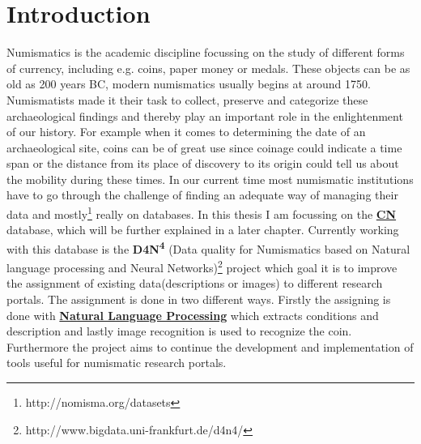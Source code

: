\documentclass[12pt, oneside]{article}
\begin{document}

\section{Introduction} \label{introduction}
Numismatics is the academic discipline focussing on the study of different forms of currency, including e.g. coins, paper money or medals. These objects can be as old as 200 years BC, modern numismatics usually begins at around 1750. Numismatists made it their task to collect, preserve and categorize these archaeological findings and thereby play an important role in the enlightenment of our history. For example when it comes to determining the date of an archaeological site, coins can be of great use since coinage could indicate a time span or the distance from its place of discovery to its origin could tell us about the mobility during these times. In our current time most numismatic institutions have to go through the challenge of finding an adequate way of managing their data and mostly\footnote{http://nomisma.org/datasets} really on databases. In this thesis I am focussing on the \hyperref[cn]{\textbf{CN}} database, which will be further explained in a later chapter. Currently working with this database is the \textbf{D4N\textsuperscript{4}} (Data quality for Numismatics based on Natural language processing and Neural Networks)\footnote{http://www.bigdata.uni-frankfurt.de/d4n4/} project which goal it is to improve the assignment of existing data(descriptions or images) to different research portals. The assignment is done in two different ways. Firstly the assigning is done with \hyperref[nlp]{\textbf{Natural Language Processing}} which extracts conditions and description and lastly image recognition is used to recognize the coin. Furthermore the project aims to continue the development and implementation of tools useful for numismatic research portals.
\end{document}
